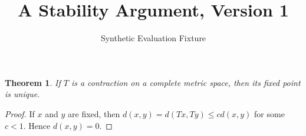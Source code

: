 \documentclass{article}
\title{A Stability Argument, Version 1}
\author{Synthetic Evaluation Fixture}
\newtheorem{theorem}{Theorem}
\begin{document}
\maketitle

\begin{theorem}\label{th:stability}
If $T$ is a contraction on a complete metric space, then its fixed point is unique.
\end{theorem}

\begin{proof}
If $x$ and $y$ are fixed, then $d(x,y)=d(Tx,Ty)\leq c d(x,y)$ for some $c<1$. Hence $d(x,y)=0$.
\end{proof}
\end{document}
